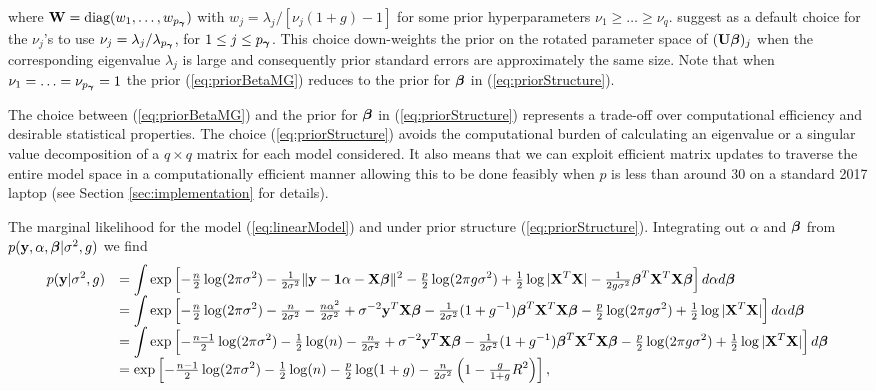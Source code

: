 \documentclass{article}[12pt]
\begin{document}
\noindent where ${\bf W} = \mbox{diag}(w_1,\ldots,w_{p_{{\boldsymbol \gamma}}})$ with $ w_j = \lambda_j/[\nu_j(1 + g) - 1]$ for 
some prior hyperparameters $\nu_1 \ge \ldots \ge \nu_q$. \cite{Maruyama2011} suggest as a default 
choice for the $\nu_j$'s to use $\nu_j = \lambda_j/\lambda_{p_{{\boldsymbol \gamma}}}$, for $1\le j \le p_{{\boldsymbol \gamma}}$. 
This choice down-weights the prior on the rotated parameter space of $({\bf U} {\boldsymbol \beta})_j$ when the 
corresponding eigenvalue $\lambda_j$ is large and consequently prior standard errors are 
approximately the same size. Note that when $\nu_1 = \ldots = \nu_{p_{{\boldsymbol \gamma}}} = 1$ the prior 
(\ref{eq:priorBetaMG}) reduces to the prior for ${\boldsymbol \beta}$ in (\ref{eq:priorStructure}). 

The choice between (\ref{eq:priorBetaMG}) and the prior for ${\boldsymbol \beta}$ in (\ref{eq:priorStructure}) 
represents a trade-off over computational efficiency and desirable statistical properties. The choice
(\ref{eq:priorStructure}) avoids the computational burden of calculating an eigenvalue or a singular 
value decomposition of a $q\times q$ matrix for each model considered. It also means that we can 
exploit efficient matrix updates to traverse the entire model space in a computationally efficient 
manner allowing this to be done feasibly when $p$ is less than around 30 on a standard 2017 laptop 
(see Section \ref{sec:implementation} for details).


The marginal likelihood for the
model  (\ref{eq:linearModel}) and under prior structure
(\ref{eq:priorStructure}). 
Integrating out $\alpha$ and ${\boldsymbol \beta}$ from 
$p({\bf y},\alpha,{\boldsymbol \beta}|\sigma^2,g)$ we find
\begin{equation}\label{eq:yGivenSigma2andG}
\begin{array}{rl}
\displaystyle p({\bf y}|\sigma^2,g)
& \displaystyle = \int \exp\left[
- \tfrac{n}{2}\log(2\pi\sigma^2) 
- \tfrac{1}{2\sigma^2}\|{\bf y} - {\bf 1}\alpha - {\bf X}{\boldsymbol \beta}\|^2
- \tfrac{p}{2}\log(2\pi g\sigma^2) 
+ \tfrac{1}{2}\log|{\bf X}^T{\bf X}|
- \tfrac{1}{2g\sigma^2}{\boldsymbol \beta}^T{\bf X}^T{\bf X}{\boldsymbol \beta}  
\right] d\alpha d{\boldsymbol \beta}
\\
& \displaystyle = \int \exp\left[
- \tfrac{n}{2}\log(2\pi\sigma^2) 
- \tfrac{n}{2\sigma^2}
- \tfrac{n\alpha^2}{2\sigma^2} 
+ \sigma^{-2}{\bf y}^T{\bf X}{\boldsymbol \beta}
- \tfrac{1}{2\sigma^2}(1 + g^{-1}){\boldsymbol \beta}^T{\bf X}^T{\bf X}{\boldsymbol \beta} 
- \tfrac{p}{2}\log(2\pi g\sigma^2) 
+ \tfrac{1}{2}\log|{\bf X}^T{\bf X}|
\right] d\alpha d{\boldsymbol \beta}
\\
& \displaystyle = \int \exp\left[
- \tfrac{n-1}{2}\log(2\pi\sigma^2) 
- \tfrac{1}{2}\log(n)
- \tfrac{n}{2\sigma^2}
+ \sigma^{-2}{\bf y}^T{\bf X}{\boldsymbol \beta}
- \tfrac{1}{2\sigma^2}(1 + g^{-1}){\boldsymbol \beta}^T{\bf X}^T{\bf X}{\boldsymbol \beta} 
- \tfrac{p}{2}\log(2\pi g\sigma^2) 
+ \tfrac{1}{2}\log|{\bf X}^T{\bf X}|
\right]  d{\boldsymbol \beta}
\\
& 
\displaystyle = \exp\left[
- \tfrac{n-1}{2}\log(2\pi\sigma^2) 
- \tfrac{1}{2}\log(n)
- \tfrac{p}{2}\log(1 + g)
- \tfrac{n}{2 \sigma^2} \left( 1 - \tfrac{g}{1 + g} R^2 \right)  
\right],
\end{array} 
\end{equation}
\end{document}
